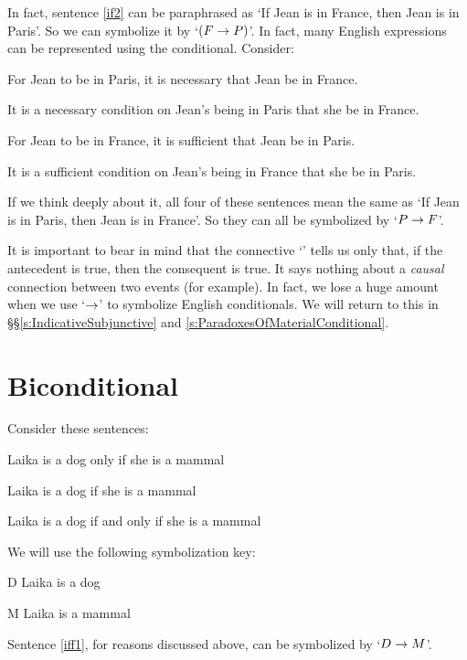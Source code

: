 In fact, sentence \ref{if2} can be paraphrased as `If Jean is in France, then Jean is in Paris'. So we can symbolize it by `$(F \rightarrow P)$'.
\noindent In fact, many English expressions can be represented using the conditional. Consider:
	\begin{earg}
		\item[\ex{ifnec1}] For Jean to be in Paris, it is necessary that Jean be in France.
		\item[\ex{ifnec2}] It is a necessary condition on Jean's being in Paris that she be in France. 
		\item[\ex{ifsuf1}] For Jean to be in France, it is sufficient that Jean be in Paris.
		\item[\ex{ifsuf2}] It is a sufficient condition on Jean's being in France that she be in Paris.
	\end{earg}
If we think deeply about it, all four of these sentences mean the same as  `If Jean is in Paris, then Jean is in France'. So they can all be symbolized by `$P \rightarrow F$'. 

It is important to bear in mind that the connective `\eif' tells us only that, if the antecedent is true, then the consequent is true. It says nothing about a \emph{causal} connection between two events (for example). In fact, we lose a huge amount when we use `$\rightarrow$' to symbolize English conditionals. We will return to this in \S\S\ref{s:IndicativeSubjunctive} and \ref{s:ParadoxesOfMaterialConditional}.

\section{Biconditional}
Consider these sentences:
	\begin{earg}
		\item[\ex{iff1}] Laika is a dog only if she is a mammal
		\item[\ex{iff2}] Laika is a dog if she is a mammal
		\item[\ex{iff3}] Laika is a dog if and only if she is a mammal
	\end{earg}
We will use the following symbolization key:
	\begin{ekey}
		\item[D] Laika is a dog
		\item[M] Laika is a mammal
	\end{ekey}
Sentence \ref{iff1}, for reasons discussed above, can be symbolized by `$D \rightarrow M$'.

